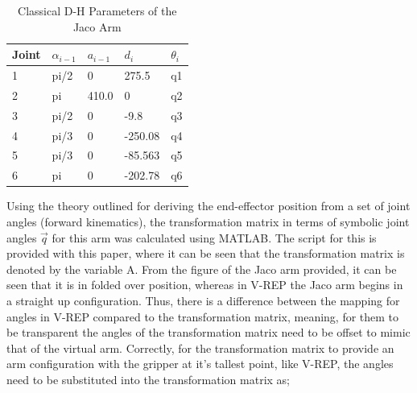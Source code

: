 \documentclass[12pt,openany,a4paper]{book}
\begin{document}




\begin{center}
\begin{table}[htb]

    \begin{tabular}{| p{2.5cm} | p{2.5cm} | p{2.5cm} | p{2.5cm} | p{2.5cm} |}
    \hline
    Joint & $\alpha_{i-1}$ & $a_{i-1}$ & $d_i$ & $\theta_{i}$ \\ \hline
     1 & pi/2 & 0 & 275.5 & q1 \\ \hline
     2 & pi & 410.0 & 0 & q2 \\ \hline
     3 & pi/2 & 0 & -9.8 & q3 \\ \hline
     4 & pi/3 & 0 & -250.08 & q4 \\ \hline
     5 & pi/3 & 0 & -85.563 & q5 \\ \hline
     6 & pi & 0 & -202.78 & q6 \\ \hline
    \end{tabular}
    \caption{Classical D-H Parameters of the Jaco Arm}
\end{table}
\end{center}


Using the theory outlined for deriving the end-effector position from a set of joint angles (forward kinematics), the transformation matrix in terms of symbolic joint angles $\vec{q}$ for this arm was calculated using MATLAB. The script for this is provided with this paper, where it can be seen that the transformation matrix is denoted by the variable A. From the figure of the Jaco arm provided, it can be seen that it is in folded over position, whereas in V-REP the Jaco arm begins in a straight up configuration. Thus, there is a difference between the mapping for angles in V-REP compared to the transformation matrix, meaning, for them to be transparent the angles of the transformation matrix need to be offset to mimic that of the virtual arm. Correctly, for the transformation matrix to provide an arm configuration with the gripper at it's tallest point, like V-REP, the angles need to be substituted into the transformation matrix as;
\vspace{\baselineskip}
\end{document}
